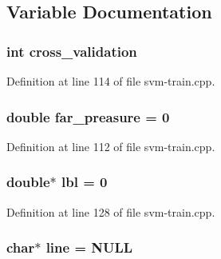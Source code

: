 \subsection{Variable Documentation}
\hypertarget{_2svm-train_8cpp_a3ed295b75b08a20ed2bbed4a67f8d18a}{
\subsubsection[{cross\-\_\-validation}]{\setlength{\rightskip}{0pt plus 5cm}int cross\-\_\-validation}}\label{_2svm-train_8cpp_a3ed295b75b08a20ed2bbed4a67f8d18a}


Definition at line 114 of file svm-\/train.\-cpp.

\hypertarget{_2svm-train_8cpp_a57ce01656059264c677404c310f3a04e}{
\subsubsection[{far\-\_\-preasure}]{\setlength{\rightskip}{0pt plus 5cm}double far\-\_\-preasure = 0}}\label{_2svm-train_8cpp_a57ce01656059264c677404c310f3a04e}


Definition at line 112 of file svm-\/train.\-cpp.

\hypertarget{_2svm-train_8cpp_a537df30cd5b5b576ee32aeffd22affe2}{
\subsubsection[{lbl}]{\setlength{\rightskip}{0pt plus 5cm}double$\ast$ lbl = 0}}\label{_2svm-train_8cpp_a537df30cd5b5b576ee32aeffd22affe2}


Definition at line 128 of file svm-\/train.\-cpp.

\hypertarget{_2svm-train_8cpp_a8adb30f4f6669f927fd9232f686c637b}{
\subsubsection[{line}]{\setlength{\rightskip}{0pt plus 5cm}char$\ast$ line = N\-U\-L\-L\hspace{0.3cm}{\ttfamily [static]}}}\label{_2svm-train_8cpp_a8adb30f4f6669f927fd9232f686c637b}


